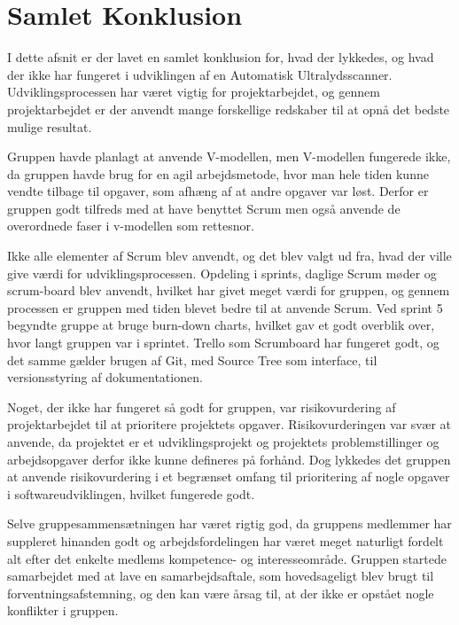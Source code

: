 \chapter{Samlet Konklusion}\label{SamletKonklusion}
I dette afsnit er der lavet en samlet konklusion for, hvad der lykkedes, og hvad der ikke har fungeret i udviklingen af en Automatisk Ultralydsscanner. Udviklingsprocessen har været vigtig for projektarbejdet, og gennem projektarbejdet er der anvendt mange forskellige redskaber til at opnå det bedste mulige resultat. 

Gruppen havde planlagt at anvende V-modellen, men V-modellen fungerede ikke, da gruppen havde brug for en agil arbejdsmetode, hvor man hele tiden kunne vendte tilbage til opgaver, som afhæng af at andre opgaver var løst. Derfor er gruppen godt tilfreds med at have benyttet Scrum men også anvende de overordnede faser i v-modellen som rettesnor.

Ikke alle elementer af Scrum blev anvendt, og det blev valgt ud fra, hvad der ville give værdi for udviklingsprocessen. Opdeling i sprints, daglige Scrum møder og scrum-board blev anvendt, hvilket har givet meget værdi for gruppen, og gennem processen er gruppen med tiden blevet bedre til at anvende Scrum. Ved sprint 5 begyndte gruppe at bruge burn-down charts, hvilket gav et godt overblik over, hvor langt gruppen var i sprintet. Trello som Scrumboard har fungeret godt, og det samme gælder brugen af Git, med Source Tree som interface, til versionsstyring af dokumentationen. 

Noget, der ikke har fungeret så godt for gruppen, var risikovurdering af projektarbejdet til at prioritere projektets opgaver. Risikovurderingen var svær at anvende, da projektet er et udviklingsprojekt og projektets problemstillinger og arbejdsopgaver derfor ikke kunne defineres på forhånd. Dog lykkedes det gruppen at anvende risikovurdering i et begrænset omfang til prioritering af nogle opgaver i softwareudviklingen, hvilket fungerede godt. 

Selve gruppesammensætningen har været rigtig god, da gruppens medlemmer har suppleret hinanden godt og arbejdsfordelingen har været meget naturligt fordelt alt efter det enkelte medlems kompetence- og interesseområde. Gruppen startede samarbejdet med at lave en samarbejdsaftale, som hovedsageligt blev brugt til forventningsafstemning, og den kan være årsag til, at der ikke er opstået nogle konflikter i gruppen. 
